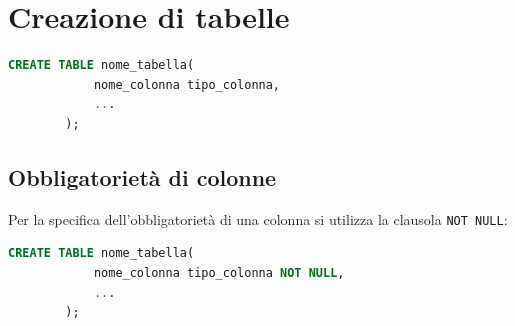 \documentclass[12pt, a4paper]{report}
\begin{document}
    \section{Creazione di tabelle}
    \begin{lstlisting}[language=SQL]
        CREATE TABLE nome_tabella(
            nome_colonna tipo_colonna,
            ...
        );
    \end{lstlisting}
    \subsection{Obbligatorietà di colonne}
    Per la specifica dell'obbligatorietà di una colonna si utilizza la clausola \texttt{NOT NULL}:
    \begin{lstlisting}[language=SQL]
        CREATE TABLE nome_tabella(
            nome_colonna tipo_colonna NOT NULL,
            ...
        );
    \end{lstlisting}
\end{document}

